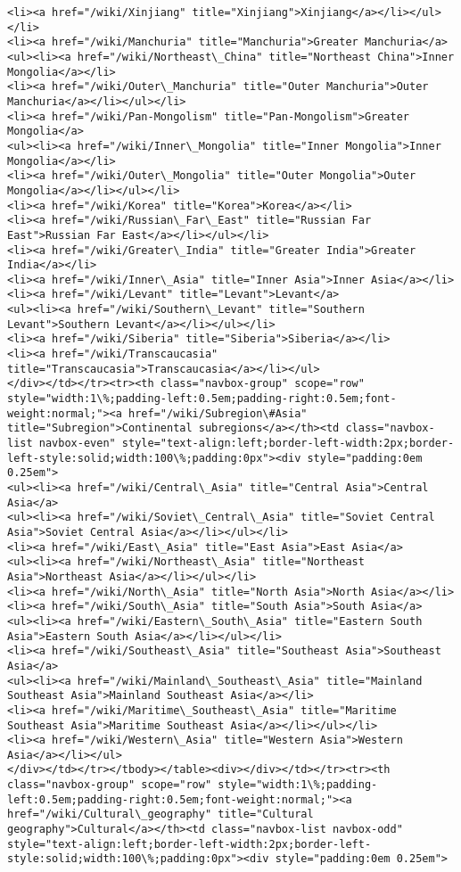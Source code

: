 \documentclass[11pt]{article}
\begin{document}
\begin{Verbatim}[commandchars=\\\{\}]
<li><a href="/wiki/Xinjiang" title="Xinjiang">Xinjiang</a></li></ul></li>
<li><a href="/wiki/Manchuria" title="Manchuria">Greater Manchuria</a>
<ul><li><a href="/wiki/Northeast\_China" title="Northeast China">Inner Mongolia</a></li>
<li><a href="/wiki/Outer\_Manchuria" title="Outer Manchuria">Outer Manchuria</a></li></ul></li>
<li><a href="/wiki/Pan-Mongolism" title="Pan-Mongolism">Greater Mongolia</a>
<ul><li><a href="/wiki/Inner\_Mongolia" title="Inner Mongolia">Inner Mongolia</a></li>
<li><a href="/wiki/Outer\_Mongolia" title="Outer Mongolia">Outer Mongolia</a></li></ul></li>
<li><a href="/wiki/Korea" title="Korea">Korea</a></li>
<li><a href="/wiki/Russian\_Far\_East" title="Russian Far East">Russian Far East</a></li></ul></li>
<li><a href="/wiki/Greater\_India" title="Greater India">Greater India</a></li>
<li><a href="/wiki/Inner\_Asia" title="Inner Asia">Inner Asia</a></li>
<li><a href="/wiki/Levant" title="Levant">Levant</a>
<ul><li><a href="/wiki/Southern\_Levant" title="Southern Levant">Southern Levant</a></li></ul></li>
<li><a href="/wiki/Siberia" title="Siberia">Siberia</a></li>
<li><a href="/wiki/Transcaucasia" title="Transcaucasia">Transcaucasia</a></li></ul>
</div></td></tr><tr><th class="navbox-group" scope="row" style="width:1\%;padding-left:0.5em;padding-right:0.5em;font-weight:normal;"><a href="/wiki/Subregion\#Asia" title="Subregion">Continental subregions</a></th><td class="navbox-list navbox-even" style="text-align:left;border-left-width:2px;border-left-style:solid;width:100\%;padding:0px"><div style="padding:0em 0.25em">
<ul><li><a href="/wiki/Central\_Asia" title="Central Asia">Central Asia</a>
<ul><li><a href="/wiki/Soviet\_Central\_Asia" title="Soviet Central Asia">Soviet Central Asia</a></li></ul></li>
<li><a href="/wiki/East\_Asia" title="East Asia">East Asia</a>
<ul><li><a href="/wiki/Northeast\_Asia" title="Northeast Asia">Northeast Asia</a></li></ul></li>
<li><a href="/wiki/North\_Asia" title="North Asia">North Asia</a></li>
<li><a href="/wiki/South\_Asia" title="South Asia">South Asia</a>
<ul><li><a href="/wiki/Eastern\_South\_Asia" title="Eastern South Asia">Eastern South Asia</a></li></ul></li>
<li><a href="/wiki/Southeast\_Asia" title="Southeast Asia">Southeast Asia</a>
<ul><li><a href="/wiki/Mainland\_Southeast\_Asia" title="Mainland Southeast Asia">Mainland Southeast Asia</a></li>
<li><a href="/wiki/Maritime\_Southeast\_Asia" title="Maritime Southeast Asia">Maritime Southeast Asia</a></li></ul></li>
<li><a href="/wiki/Western\_Asia" title="Western Asia">Western Asia</a></li></ul>
</div></td></tr></tbody></table><div></div></td></tr><tr><th class="navbox-group" scope="row" style="width:1\%;padding-left:0.5em;padding-right:0.5em;font-weight:normal;"><a href="/wiki/Cultural\_geography" title="Cultural geography">Cultural</a></th><td class="navbox-list navbox-odd" style="text-align:left;border-left-width:2px;border-left-style:solid;width:100\%;padding:0px"><div style="padding:0em 0.25em">

\end{Verbatim}
\end{document}
